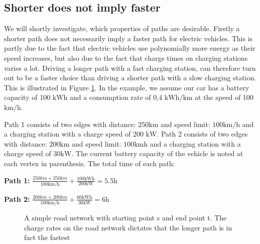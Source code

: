 \subsection{Shorter does not imply faster}
\label{sec:shorternotfaster}
We will shortly investigate, which properties of paths are desirable. Firstly a shorter path does not necessarily imply a faster path for electric vehicles. This is partly due to the fact that electric vehicles use polynomially more energy as their speed increases, but also due to the fact that charge times on charging stations varies a lot. Driving a longer path with a fast charging station, can therefore turn out to be a faster choice than driving a shorter path with a slow charging station. This is illustrated in Figure \ref{fig:simpleroad-network}. In the example, we assume our car has a battery capacity of 100 $\si{\kWh}$ and a consumption rate of 0,4 $\si{\kWh\per\km}$ at the speed of 100 $\si{\km\per\hour}$.

Path 1 consists of two edges with distance: $ 250 \si{\km}$ and speed limit: $100 \si{\km\per\hour}$
and a charging station with a charge speed of 200 $\si{\kW}$. Path 2 consists of two edges with distance: $200 \si{\km}$ and speed limit: $100 \si{\km\hour}$ and a charging station with a charge speed of $30\si{\kW}$. The current battery capacity of the vehicle is noted at each vertex in parenthesis. The total time of each path:
				
\textbf{Path 1:} $\frac{250\si{km} + 250\si{km}}{100\si{\km\per\hour}} + \frac{100\si{\kWh}}{200\si{\kW}} = 5.5\si{\hour}$

\textbf{Path 2:} $\frac{200\si{km} + 200\si{km}}{100 \si{\km\per\hour}} + \frac{60\si{\kWh}}{30\si{\kW}} = 6\si{\hour}$


\begin{figure}
\centering
{}
\label{fig:simpleroad-network}
\caption{A simple road network with starting point s and end point t. The charge rates on the road network dictates that the longer path is in fact the fastest}
\end{figure}